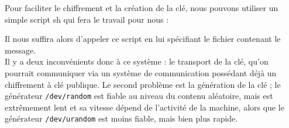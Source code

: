Pour faciliter le chiffrement et la création de la clé, nous pouvons
utiliser un simple script sh qui fera le travail pour nous : 

\lstset{language=bash}


Il nous suffira alors d'appeler ce script en lui spécifiant le fichier
contenant le message.\\

Il y a deux inconvénients donc à ce système : le transport de la clé,
qu'on pourrait communiquer via un système de communication possédant
déjà un chiffrement à clé publique. Le second problème est la
génération de la clé ; le générateur \texttt{/dev/random} est fiable
au niveau du contenu aléatoire, mais est extrêmement lent et sa
vitesse dépend de l'activité de la machine, alors que le
générateur \texttt{/dev/urandom} est moins fiable, mais bien plus
rapide.

